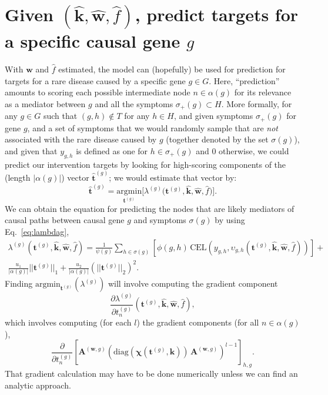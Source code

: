 \documentclass[11pt,notitlepage,english]{article}
\begin{document}
\section{Given $(\widehat{\boldsymbol k}, \widehat{\boldsymbol w}, \widehat{f})$, predict targets for a specific causal gene $g$}\label{sec:pred}
With $\widehat{\boldsymbol w}$ and $\widehat{f}$ estimated, the model can (hopefully) be
used for prediction for targets for a rare disease caused by a specific gene
$g \in G$. Here, ``prediction'' amounts to scoring each possible intermediate
node $n \in \alpha(g)$ for its relevance as a mediator between $g$ and all the
symptoms $\sigma_{+}(g) \subset H$. More formally, for any $g \in
G$ such that $(g,h) \not\in T$ for any $h \in H$,
and given symptoms $\sigma_{+}(g)$ for gene $g$, and a set of symptoms that we would
randomly sample that are {\em not\/}
associated with the rare disease caused by $g$ (together denoted by the set $\sigma(g)$),
and given that $y_{g,h}$ is defined as one for $h \in \sigma_{+}(g)$ and 0 otherwise, 
we could predict our intervention
targets by looking for high-scoring components of the (length $|\alpha(g)|$)
vector $\widehat{\boldsymbol t}^{(g)}$; we would estimate that vector by:
\begin{equation}
  \widehat{\boldsymbol t}^{(g)} = \underset{{\boldsymbol t}^{(g)}}{\textrm{argmin}}
  \biggl[
    \lambda^{(g)}\bigl({\boldsymbol t}^{(g)},\widehat{\boldsymbol k},\widehat{\boldsymbol w},\widehat{f}\bigr)
    \biggr].
\end{equation}
We can obtain the equation for predicting the nodes that are likely mediators of causal
paths between causal gene $g$ and symptoms $\sigma(g)$ by using Eq.~\ref{eq:lambdag}, 
\begin{multline}
  \label{eq:nodeweights}
  \lambda^{(g)}({\boldsymbol t}^{(g)}, \widehat{\boldsymbol k},
  \widehat{\boldsymbol w}, \widehat{f}) =  \frac{1}{\psi(g)}
  \sum\limits_{h \in \sigma(g)} \left[
   \phi(g, h)\, \textrm{CEL}\!\left(y_{g,h}, \upsilon_{g,h}({\boldsymbol
     t}^{(g)},\widehat{\boldsymbol k}, \widehat{\boldsymbol w},\widehat{f})\right) \right] + \\
  \frac{u_1}{|\alpha(g)|}
  ||{\boldsymbol t}^{(g)}||_1
  + \frac{u_2}{|\alpha(g)|} {(||{\boldsymbol t}^{(g)}||_2)}^2.
\end{multline}
Finding $\textrm{argmin}_{{\boldsymbol t}^{(g)}} (\lambda^{(g)})$ will involve computing the gradient component
\begin{equation}
  \frac{\partial \lambda^{(g)}}{\partial t^{(g)}_n}({\boldsymbol t}^{(g)}, \widehat{\boldsymbol k}, \widehat{\boldsymbol w}, \widehat{f}),
\end{equation}
which involves computing (for each $l$) the gradient components (for all $n \in \alpha(g)$),
\begin{equation}
  \frac{\partial}{\partial t^{(g)}_n}{\left[
        {\boldsymbol A}^{({\boldsymbol w},g)}
      {\left(\textrm{diag}(\boldsymbol{\chi}({\boldsymbol t}^{(g)},{\boldsymbol k})) \,
        {\boldsymbol A}^{({\boldsymbol w},g)}
     \right)}^{l-1}\right]}_{h,g}.
\end{equation}
That gradient calculation may have to be done numerically unless we can find an analytic approach.
\end{document}
